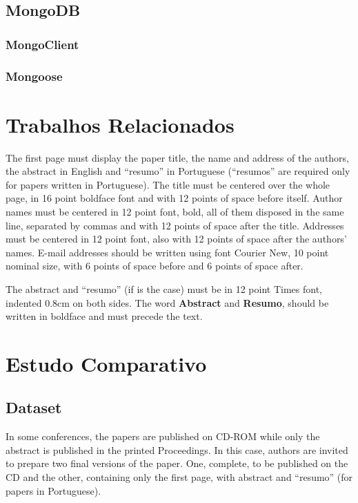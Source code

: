 \documentclass[12pt]{article}
\begin{document}
\subsection{MongoDB}


\subsubsection{MongoClient}

\subsubsection{Mongoose}



\section{Trabalhos Relacionados} 
\label{section:relacionados}

The first page must display the paper title, the name and address of the
authors, the abstract in English and ``resumo'' in Portuguese (``resumos'' are
required only for papers written in Portuguese). The title must be centered
over the whole page, in 16 point boldface font and with 12 points of space
before itself. Author names must be centered in 12 point font, bold, all of
them disposed in the same line, separated by commas and with 12 points of
space after the title. Addresses must be centered in 12 point font, also with
12 points of space after the authors' names. E-mail addresses should be
written using font Courier New, 10 point nominal size, with 6 points of space
before and 6 points of space after.

The abstract and ``resumo'' (if is the case) must be in 12 point Times font,
indented 0.8cm on both sides. The word \textbf{Abstract} and \textbf{Resumo},
should be written in boldface and must precede the text.

\section{Estudo Comparativo}

\subsection{Dataset}

In some conferences, the papers are published on CD-ROM while only the
abstract is published in the printed Proceedings. In this case, authors are
invited to prepare two final versions of the paper. One, complete, to be
published on the CD and the other, containing only the first page, with
abstract and ``resumo'' (for papers in Portuguese).
\end{document}
